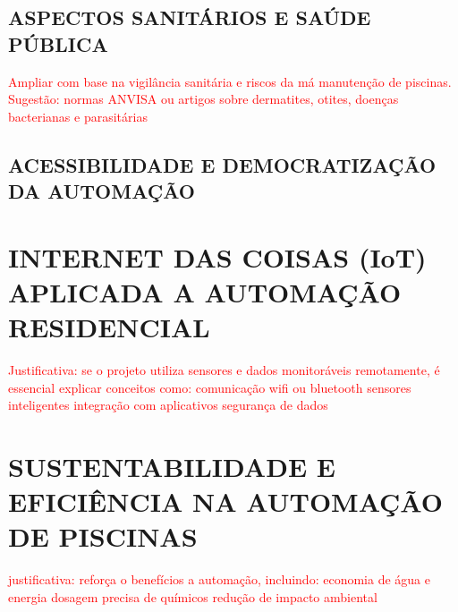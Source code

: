     \subsection{ASPECTOS SANITÁRIOS E SAÚDE PÚBLICA}
        \textcolor{red}{Ampliar com base na vigilância sanitária e riscos da má manutenção de piscinas. Sugestão: normas ANVISA ou artigos sobre dermatites, otites, doenças bacterianas e parasitárias}

    \subsection{ACESSIBILIDADE E DEMOCRATIZAÇÃO DA AUTOMAÇÃO}


\section{INTERNET DAS COISAS (IoT) APLICADA A AUTOMAÇÃO RESIDENCIAL}
    \textcolor{red}{Justificativa: se o projeto utiliza sensores e dados monitoráveis remotamente, é essencial explicar conceitos como:
        comunicação wifi ou bluetooth
        sensores inteligentes
        integração com aplicativos
        segurança de dados}

\section{SUSTENTABILIDADE E EFICIÊNCIA NA AUTOMAÇÃO DE PISCINAS}
    \textcolor{red}{justificativa: reforça o benefícios a automação, incluindo:
        economia de água e energia
        dosagem precisa de químicos
        redução de impacto ambiental}

